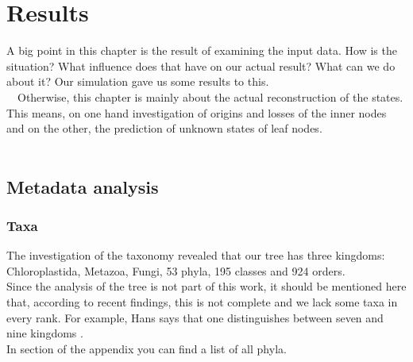 \chapter{Results}
  A big point in this chapter is the result of examining the input data. How is the situation? What 
    influence does that have on our actual result? What can we do about it? Our simulation gave us 
    some results to this. \\
  Otherwise, this chapter is mainly about the actual reconstruction of the states. This means, on 
    one hand investigation of origins and losses of the inner nodes and on the other, the prediction 
    of unknown states of leaf nodes. \\
   
  \section{Metadata analysis}

    \subsection{Taxa}
      The investigation of the taxonomy revealed that our tree has three kingdoms: Chloroplastida, 
        Metazoa, Fungi, 53 phyla, 195 classes and 924 orders. \\
      Since the analysis of the tree is not part of this work, it should be mentioned here that, 
        according to recent findings, this is not complete and we lack some taxa in every rank. For 
        example, Hans says that one distinguishes between seven and nine kingdoms 
        \cite{CavalierSmith1981}. \\
      In section \pageref{sec:listPhyla} of the appendix you can find a list of all phyla.
      
